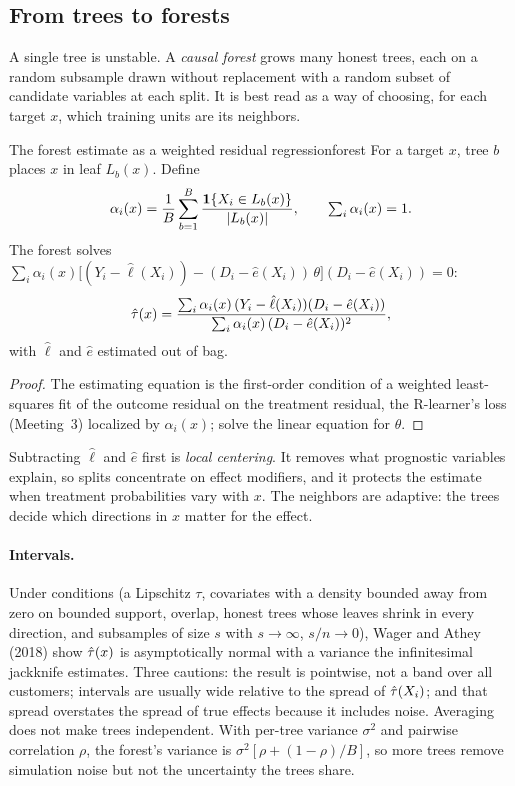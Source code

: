 \documentclass[11pt]{article}
\begin{document}
\subsection{From trees to forests}

A single tree is unstable. A \emph{causal forest} grows many honest trees, each on a random subsample drawn
without replacement with a random subset of candidate variables at each split. It is best read as a way of
choosing, for each target $x$, which training units are its neighbors.

\begin{prop}{The forest estimate as a weighted residual regression}{forest}
For a target $x$, tree $b$ places $x$ in leaf $L_b(x)$. Define
\[
  \alpha_i(x) = \frac1B\sum_{b=1}^B \frac{\mathbf{1}\{X_i \in L_b(x)\}}{|L_b(x)|}, \qquad \textstyle\sum_i \alpha_i(x) = 1 .
\]
The forest solves $\sum_i \alpha_i(x)\big[(Y_i - \hat\ell(X_i)) - (D_i - \hat e(X_i))\,\theta\big](D_i - \hat e(X_i)) = 0$:
\[
  \hat{\tau}(x) = \frac{\sum_i \alpha_i(x)\,(Y_i - \hat\ell(X_i))(D_i - \hat e(X_i))}{\sum_i \alpha_i(x)\,(D_i - \hat e(X_i))^2},
\]
with $\hat\ell$ and $\hat e$ estimated out of bag.
\end{prop}
\begin{proof}
The estimating equation is the first-order condition of a weighted least-squares fit of the outcome residual on the
treatment residual, the R-learner's loss (Meeting~3) localized by $\alpha_i(x)$; solve the linear equation for
$\theta$.
\end{proof}

Subtracting $\hat\ell$ and $\hat e$ first is \emph{local centering}. It removes what prognostic variables explain, so
splits concentrate on effect modifiers, and it protects the estimate when treatment probabilities vary with $x$.
The neighbors are adaptive: the trees decide which directions in $x$ matter for the effect.

\paragraph{Intervals.} Under conditions (a Lipschitz $\tau$, covariates with a density bounded away from zero on
bounded support, overlap, honest trees whose leaves shrink in every direction, and subsamples of size $s$ with
$s \to \infty$, $s/n \to 0$), Wager and Athey (2018) show $\hat{\tau}(x)$ is asymptotically normal with a variance the
infinitesimal jackknife estimates. Three cautions: the result is pointwise, not a band over all customers;
intervals are usually wide relative to the spread of $\hat{\tau}(X_i)$; and that spread overstates the spread of
true effects because it includes noise. Averaging does not make trees independent. With per-tree variance
$\sigma^2$ and pairwise correlation $\rho$, the forest's variance is $\sigma^2[\rho + (1-\rho)/B]$, so more trees
remove simulation noise but not the uncertainty the trees share.
\end{document}
